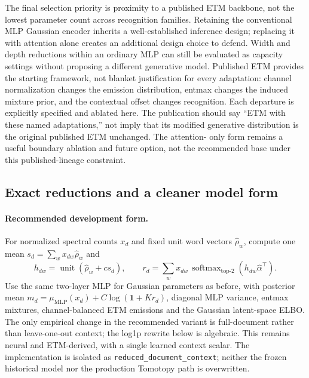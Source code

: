 \documentclass[10pt,a4paper]{article}
\begin{document}
The final selection priority is proximity to a published ETM backbone, not the
lowest parameter count across recognition families. Retaining the conventional
MLP Gaussian encoder inherits a well-established inference design; replacing it
with attention alone creates an additional design choice to defend. Width and
depth reductions within an ordinary MLP can still be evaluated as capacity
settings without proposing a different generative model. Published ETM provides
the starting framework, not blanket justification for every adaptation:
channel normalization changes the emission distribution, entmax changes the
induced mixture prior, and the contextual offset changes recognition. Each
departure is explicitly specified and ablated here. The publication should
say ``ETM with these named adaptations,'' not imply that its modified
generative distribution is the original published ETM unchanged. The attention-
only form remains a useful boundary ablation and future option, not the
recommended base under this published-lineage constraint.

\subsection{Exact reductions and a cleaner model form}
\label{sec:exact-reductions}

\paragraph{Recommended development form.}
For normalized spectral counts $x_d$ and fixed unit word vectors
$\widehat\rho_w$, compute one mean $s_d=\sum_w x_{dw}\widehat\rho_w$ and
\begin{equation}
 h_{dw}=\operatorname{unit}(\widehat\rho_w+c s_d),\qquad
 r_d=\sum_w x_{dw}\,
 \operatorname{softmax}_{\mathrm{top}\text{-}2}
       (h_{dw}\widehat\alpha^{\top}).
 \label{eq:recommended-context}
\end{equation}
Use the same two-layer MLP for Gaussian parameters as before, with
posterior mean $m_d=\mu_{\mathrm{MLP}}(x_d)+C\log(\mathbf{1}+Kr_d)$,
diagonal MLP variance, entmax mixtures, channel-balanced ETM emissions and
the Gaussian latent-space ELBO. The only empirical change in the recommended
variant is full-document rather than leave-one-out context; the log1p
rewrite below is algebraic. This remains neural and ETM-derived, with a
single learned context scalar. The implementation is isolated as
\texttt{reduced\_document\_context}; neither the frozen historical model nor
the production Tomotopy path is overwritten.
\end{document}
